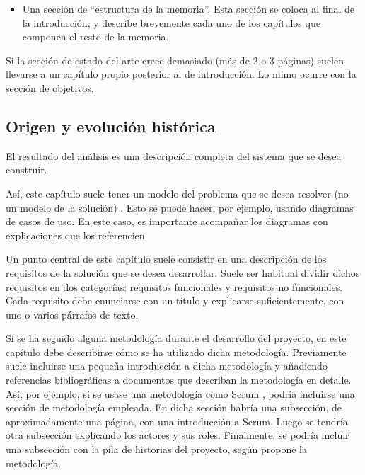 \documentclass[12pt,spanish,chapterprefix, numbers=noenddot]{book}
\numberwithin{equation}{section}
\numberwithin{figure}{section}
\begin{document}
\begin{itemize}
        específicos. Un objetivo general es la finalidad del porqué empezamos
        a desarrollar un proyecto, mientras que los objetivos específicos
        de un proyecto corresponden a los pasos que debemos seguir para alcanzar
        el objetivo general.\\
        También es una buena práctica escribir esta sección antes de comenzar
        el desarrollo del proyecto, pues permite que el alumno entienda los
        objetivos que se persiguen. En esta ocasión es más necesario que nunca
        la supervisión del tutor, pues en caso contrario el alumno puede desarrollar
        el TFT equivocado.
        \item Una sección de ``estructura de la memoria''. Esta sección se coloca
        al final de la introducción, y describe brevemente cada uno de los
        capítulos que componen el resto de la memoria.
    \end{itemize}
    Si la sección de estado del arte crece demasiado (más de 2 o 3 páginas)
    suelen llevarse a un capítulo propio posterior al de introducción.
    Lo mimo ocurre con la sección de objetivos.

    \subsection{Origen y evolución histórica}

    El resultado del análisis es una descripción completa del sistema
    que se desea construir.

    Así, este capítulo suele tener un modelo del problema que se desea
    resolver (no un modelo de la solución) \cite{ARQHYS2018}. Esto se
    puede hacer, por ejemplo, usando diagramas de casos de uso. En este
    caso, es importante acompañar los diagramas con explicaciones que
    los referencien.

    Un punto central de este capítulo suele consistir en una descripción
    de los requisitos de la solución que se desea desarrollar. Suele ser
    habitual dividir dichos requisitos en dos categorías: requisitos funcionales
    y requisitos no funcionales. Cada requisito debe enunciarse con un
    título y explicarse suficientemente, con uno o varios párrafos de
    texto.

    Si se ha seguido alguna metodología durante el desarrollo del proyecto,
    en este capítulo debe describirse cómo se ha utilizado dicha metodología.
    Previamente suele incluirse una pequeña introducción a dicha metodología
    y añadiendo referencias bibliográficas a documentos que describan
    la metodología en detalle. Así, por ejemplo, si se usase una metodología
    como Scrum \cite{Scrum}, podría incluirse una sección de metodología
    empleada. En dicha sección habría una subsección, de aproximadamente
    una página, con una introducción a Scrum. Luego se tendría otra subsección
    explicando los actores y sus roles. Finalmente, se podría incluir
    una subsección con la pila de historias del proyecto, según propone
    la metodología.
\end{document}
